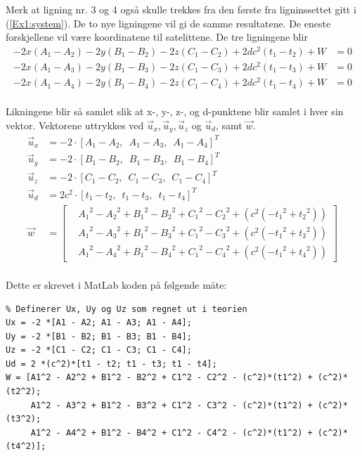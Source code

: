 Merk at ligning nr. 3 og 4 også skulle trekkes fra den første fra ligninssettet gitt i (\ref{Ex1:system}). De to nye ligningene vil gi de samme resultatene. De eneste forskjellene vil være koordinatene til satelittene. De tre ligningene blir
\begin{align}
- 2x({A_1} - {A_2}) - 2y({B_1} - {B_2}) - 2z({C_1} - {C_2}) + 2d{c^2}({t_1} - {t_2}) + W &= 0 \nonumber \\
- 2x({A_1} - {A_3}) - 2y({B_1} - {B_3}) - 2z({C_1} - {C_3}) + 2d{c^2}({t_1} - {t_3}) + W &= 0  \nonumber\\
- 2x({A_1} - {A_4}) - 2y({B_1} - {B_4}) - 2z({C_1} - {C_4}) + 2d{c^2}({t_1} - {t_4}) + W &= 0 \nonumber \\ \label{Ex1:3equations}
\end{align}

Likningene blir så samlet slik at x-, y-, z-, og d-punktene blir samlet i hver sin vektor. Vektorene uttrykkes ved ${\vec u_x}, {\vec u_y}, {\vec u_z}$ og  ${\vec u_d}$, samt $\vec{w}$. 
\begin{align}
	{\vec u_x} &=  - 2\cdot[{A_1} - {A_2}, \enspace {A_1} - {A_3},  \enspace{A_1} - {A_4}]^T \nonumber \\
	{\vec u_y} &=  - 2\cdot[{B_1} - {B_2},  \enspace{B_1} - {B_3},  \enspace{B_1} - {B_4}]^T \nonumber \\
	{\vec u_z} &=  - 2\cdot[{C_1} - {C_2},  \enspace{C_1} - {C_3},  \enspace{C_1} - {C_4}]^T \nonumber \\
	{\vec u_d} &=  2c^2\cdot[{t_1} - {t_2},  \enspace{t_1} - {t_3},  \enspace{t_1} - {t_4}]^T \nonumber \\
	{\vec w}  &= 
	\begin{bmatrix}
		&{A_1}^2 - {A_2}^2 + {B_1}^2 - {B_2}^2 + {C_1}^2 - {C_2}^2 + ({c^2}( - {t_1}^2 + {t_2}^2)) \\
		&{A_1}^2 - {A_3}^2 + {B_1}^2 - {B_3}^2 + {C_1}^2 - {C_3}^2 + ({c^2}( - {t_1}^2 + {t_3}^2)) \\ 
		&{A_1}^2 - {A_4}^2 + {B_1}^2 - {B_4}^2 + {C_1}^2 - {C_4}^2 + ({c^2}( - {t_1}^2 + {t_4}^2))
	\end{bmatrix}\nonumber \\ \nonumber
\end{align}

Dette er skrevet i MatLab koden på følgende måte: 

\begin{lstlisting}
% Definerer Ux, Uy og Uz som regnet ut i teorien 
Ux = -2 *[A1 - A2; A1 - A3; A1 - A4];
Uy = -2 *[B1 - B2; B1 - B3; B1 - B4];
Uz = -2 *[C1 - C2; C1 - C3; C1 - C4];
Ud = 2 *(c^2)*[t1 - t2; t1 - t3; t1 - t4];
W = [A1^2 - A2^2 + B1^2 - B2^2 + C1^2 - C2^2 - (c^2)*(t1^2) + (c^2)*(t2^2); 
     A1^2 - A3^2 + B1^2 - B3^2 + C1^2 - C3^2 - (c^2)*(t1^2) + (c^2)*(t3^2); 
     A1^2 - A4^2 + B1^2 - B4^2 + C1^2 - C4^2 - (c^2)*(t1^2) + (c^2)*(t4^2)]; 
\end{lstlisting}

